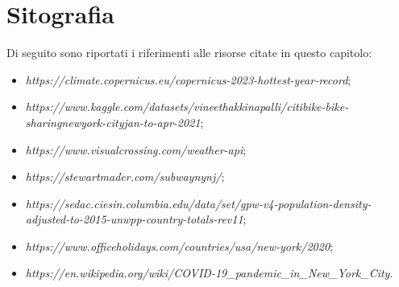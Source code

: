\section{Sitografia}
\label{sitografia_capitolo_4}
Di seguito sono riportati i riferimenti alle risorse citate in questo capitolo:
\begin{itemize}
	\item \textit{https://climate.copernicus.eu/copernicus-2023-hottest-year-record};
	\item \textit{https://www.kaggle.com/datasets/vineethakkinapalli/citibike-bike-sharingnewyork-cityjan-to-apr-2021};
	\item \textit{https://www.visualcrossing.com/weather-api};
	\item \textit{https://stewartmader.com/subwaynynj/};
	\item \textit{https://sedac.ciesin.columbia.edu/data/set/gpw-v4-population-density-adjusted-to-2015-unwpp-country-totals-rev11};
	\item \textit{https://www.officeholidays.com/countries/usa/new-york/2020};
	\item \textit{https://en.wikipedia.org/wiki/COVID-19\_pandemic\_in\_New\_York\_City}.
\end{itemize}
